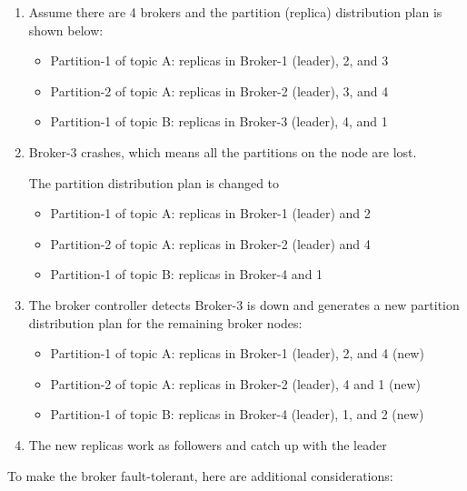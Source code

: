 \documentclass{report}
\theoremstyle{definition}
\begin{document}
\begin{enumerate}
\item
Assume there are 4 brokers and the partition (replica) distribution plan is shown below:

\begin{itemize}
\item
Partition-1 of topic A: replicas in Broker-1 (leader), 2, and 3
\item
Partition-2 of topic A: replicas in Broker-2 (leader), 3, and 4
\item
Partition-1 of topic B: replicas in Broker-3 (leader), 4, and 1
\end{itemize}
\item
Broker-3 crashes, which means all the partitions on the node are lost.

The partition distribution plan is changed to

\begin{itemize}
\item
Partition-1 of topic A: replicas in Broker-1 (leader) and 2
\item
Partition-2 of topic A: replicas in Broker-2 (leader) and 4
\item
Partition-1 of topic B: replicas in Broker-4 and 1
\end{itemize}

\item
The broker controller detects Broker-3 is down and generates a new partition distribution plan for the remaining broker nodes:

\begin{itemize}
\item
Partition-1 of topic A: replicas in Broker-1 (leader), 2, and 4 (new)
\item
Partition-2 of topic A: replicas in Broker-2 (leader), 4 and 1 (new)
\item
Partition-1 of topic B: replicas in Broker-4 (leader), 1, and 2 (new)
\end{itemize}
\item
The new replicas work as followers and catch up with the leader
\end{enumerate}

To make the broker fault-tolerant, here are additional considerations:
\end{document}
